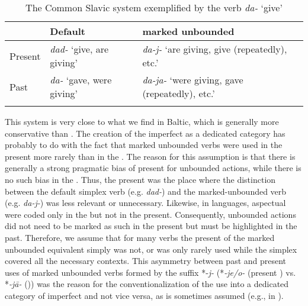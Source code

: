 \documentclass[output=paper]{langsci/langscibook}
\begin{document}
\begin{table}
\caption{The Common Slavic system exemplified by the verb \textit{da-} ‘give’}
\label{tab:wiemerserzant:8}
\begin{tabularx}{\textwidth}{llX}
\lsptoprule
 & Default & marked unbounded\\
\midrule
Present & \textit{dad-} ‘give, are giving’ & \textit{da-j-} ‘are giving, give (repeatedly), etc.’\\
Past & \textit{da-} ‘gave, were giving’ & \textit{da-ja-} ‘were giving, gave (repeatedly), etc.’\\
\lspbottomrule
\end{tabularx}
\end{table}

This system is very close to what we find in Baltic, which is generally more conservative than . The creation of the imperfect as a dedicated category has probably to do with the fact that marked unbounded verbs were used in the present more rarely than in the . The reason for this assumption is that there is generally a strong pragmatic bias of present  for unbounded actions, while there is no such bias in the . Thus, the present  was the place where the distinction between the default simplex verb (e.g. \textit{dad-}) and the marked-unbounded verb (e.g. \textit{da-j-}) was less relevant or unnecessary. Likewise, in  languages,  aspectual  were coded only in the  but not in the present. Consequently, unbounded actions did not need to be marked as such in the present but must be highlighted in the past. Therefore, we assume that for many verbs the present  of the marked unbounded equivalent simply was not, or was only rarely used while the simplex covered all the necessary contexts. This asymmetry between past and present uses of marked unbounded verbs formed by the suffix *-\textit{j-} (*\textit{-je/o-} (present ) vs. *\textit{-jā-} ()) was the reason for the conventionalization of the  use into a dedicated category of imperfect and not vice versa, as is sometimes assumed (e.g., in \citealt{Borodič1953}).
\end{document}
